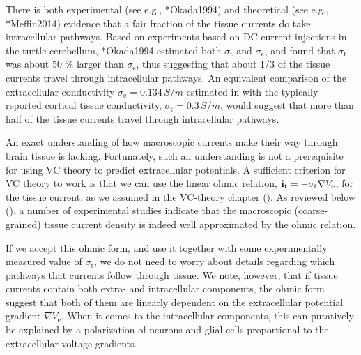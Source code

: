 There is both experimental (see e.g., \citeasnoun**{Okada1994}) and theoretical (see e.g., \citeasnoun**{Meffin2014}) 
evidence that a fair fraction of the tissue currents do take intracellular pathways. 
Based on experiments based on DC current injections in the turtle cerebellum, 
\citeasnoun**{Okada1994} estimated both $\sigma_\text{t}$ and $\sigma_\text{e}$, 
and found that $\sigma_\text{t}$ was about 50 \% larger than $\sigma_\text{e}$, 
thus suggesting that about 1/3 of the tissue currents travel through intracellular pathways.
An equivalent comparison of the extracellular conductivity $\sigma_\text{e} = 0.134\, \si{S/m}$ 
estimated in  with the typically reported cortical tissue conductivity, 
$\sigma_\text{t} = 0.3 \,\si{S/m}$, would suggest that more than half of the tissue currents 
travel through intracellular pathways.

An exact understanding of how macroscopic currents make their way through brain tissue is lacking. 
Fortunately, such an understanding is not a prerequisite for using VC theory to predict extracellular potentials.
A sufficient criterion for VC theory to work is that we can use the linear ohmic relation, 
${\bf i}_\text{t} = -\sigma_\text{t} \nabla V_\text{e}$, for the tissue current, 
as we assumed in the VC-theory chapter (). 
As reviewed below (), 
a number of experimental studies indicate that the macroscopic (coarse-grained) tissue current density is indeed
well approximated by the ohmic relation.

If we accept this ohmic form, and use it together with some experimentally measured value of $\sigma_\text{t}$, 
we do not need to worry about details regarding which pathways that currents follow through tissue. 
We note, however, that if tissue currents contain both extra- and intracellular components, 
the ohmic form suggest that both of them are linearly dependent on the extracellular
potential gradient $\nabla V_\text{e}$. When it comes to the intracellular components, 
this can putatively be explained by a polarization of neurons and glial cells
proportional to the extracellular voltage gradients. 


